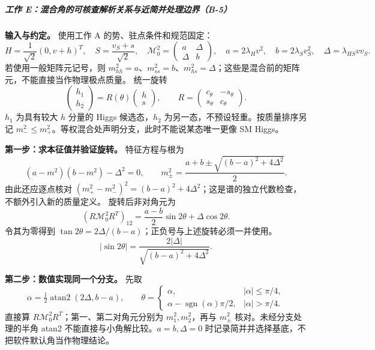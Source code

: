 \documentclass[
  chinese,
  UTF8]{ctexart}
\begin{document}
\subparagraph{工作
E：混合角的可核查解析关系与近简并处理边界（B-5）}\label{ux5de5ux4f5c-eux6df7ux5408ux89d2ux7684ux53efux6838ux67e5ux89e3ux6790ux5173ux7cfbux4e0eux8fd1ux7b80ux5e76ux5904ux7406ux8fb9ux754cb-5}

\textbf{输入与约定。} 使用工作 A 的势、驻点条件和规范固定： \[
H=\frac1{\sqrt2}(0,v+h)^T,\quad S=\frac{v_S+s}{\sqrt2},\quad
\mathcal M_0^2=\begin{pmatrix}a&\Delta\\\Delta&b\end{pmatrix},
\quad a=2\lambda_Hv^2,\quad b=2\lambda_Sv_S^2,\quad\Delta=\lambda_{HS}vv_S.
\] 若使用一般矩阵元记号，则
\(m_{hh}^2=a\)、\(m_{ss}^2=b\)、\(m_{hs}^2=\Delta\)；这些是混合前的矩阵元，不能直接当作物理极点质量。
统一旋转 \[
\begin{pmatrix}h_1\\h_2\end{pmatrix}
=R(\theta)\begin{pmatrix}h\\s\end{pmatrix},\qquad
R=\begin{pmatrix}c_\theta&-s_\theta\\s_\theta&c_\theta\end{pmatrix}.
\] \(h_1\) 为具有较大 \(h\) 分量的 Higgs 候选态，\(h_2\)
为另一态，不预设轻重。按质量排序另记
\(m_-^2\le m_+^2\)。等权混合处声明分支，此时不能说某态唯一更像 SM
Higgs。

\textbf{第一步：求本征值并验证旋转。} 特征方程与根为 \[
(a-m^2)(b-m^2)-\Delta^2=0,\qquad
m_\pm^2=\frac{a+b\pm\sqrt{(b-a)^2+4\Delta^2}}2.
\] 由此还应逐点核对
\((m_+^2-m_-^2)^2=(b-a)^2+4\Delta^2\)；这是谱的独立代数检查，不额外引入新的质量定义。
旋转后非对角元为 \[
(R\mathcal M_0^2R^T)_{12}=\frac{a-b}{2}\sin2\theta+\Delta\cos2\theta.
\] 令其为零得到
\(\tan2\theta=2\Delta/(b-a)\)；正负号与上述旋转必须一并使用。 \[
\lvert\sin2\theta\rvert=\frac{2\lvert\Delta\rvert}{\sqrt{(b-a)^2+4\Delta^2}}.
\]

\textbf{第二步：数值实现同一个分支。} 先取 \[
\alpha=\tfrac12\operatorname{atan2}(2\Delta,b-a),\qquad
\theta=\begin{cases}\alpha,&\lvert\alpha\rvert\le\pi/4,\\
\alpha-\operatorname{sgn}(\alpha)\pi/2,&\lvert\alpha\rvert>\pi/4.\end{cases}
\] 直接算 \(R\mathcal M_0^2R^T\)；第一、第二对角元分别为
\(m_1^2,m_2^2\)，再与 \(m_\pm^2\) 核对。未经分支处理的半角 atan2
不能直接与小角解比较。\(a=b,\Delta=0\)
时记录简并并选择基底，不把软件默认角当作物理结论。
\end{document}
